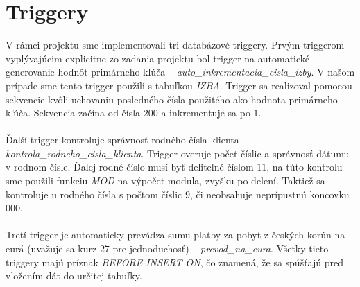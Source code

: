 \documentclass[a4paper,11pt,titlepage]{article}[11.3.2016]
\begin{document}
\section{Triggery}
V rámci projektu sme implementovali tri databázové triggery. Prvým triggerom vyplývajúcim explicitne zo zadania projektu bol trigger na automatické generovanie hodnôt primárneho kľúča -- \textit{auto\_inkrementacia\_cisla\_izby}. V našom prípade sme tento trigger použili s tabuľkou \textit{IZBA}. Trigger sa realizoval pomocou sekvencie kvôli uchovaniu posledného čísla použitého ako hodnota primárneho kľúča. Sekvencia začína od čísla $200$ a inkrementuje sa po $1$.\\
\\
Ďalší trigger kontroluje správnosť rodného čísla klienta -- \textit{kontrola\_rodneho\_cisla\_klienta}. Trigger overuje počet číslic a správnosť dátumu v rodnom čísle. Ďalej rodné číslo musí byť deliteľné číslom $11$, na túto kontrolu sme použili funkciu \textit{MOD} na výpočet modula, zvyšku po delení. Taktiež sa kontroluje u rodného čísla s počtom číslic $9$, či neobsahuje neprípustnú koncovku $000$.\\
\\
Tretí trigger je automaticky prevádza sumu platby za pobyt z českých korún na eurá (uvažuje sa kurz $27$ pre jednoduchosť) -- \textit{prevod\_na\_eura}. Všetky tieto triggery majú príznak \textit{BEFORE INSERT ON}, čo znamená, že sa spúšťajú pred vložením dát do určitej tabuľky.
\end{document}
